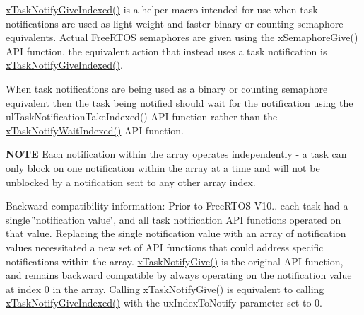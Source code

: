 \hyperlink{externals_2freertos_2include_2task_8h_a53ec0c8b6b8281a3055747813570193c}{x\+Task\+Notify\+Give\+Indexed()} is a helper macro intended for use when task notifications are used as light weight and faster binary or counting semaphore equivalents. Actual Free\+R\+T\+OS semaphores are given using the \hyperlink{externals_2freertos_2include_2semphr_8h_aae55761cabfa9bf85c8f4430f78c0953}{x\+Semaphore\+Give()} A\+PI function, the equivalent action that instead uses a task notification is \hyperlink{externals_2freertos_2include_2task_8h_a53ec0c8b6b8281a3055747813570193c}{x\+Task\+Notify\+Give\+Indexed()}.

When task notifications are being used as a binary or counting semaphore equivalent then the task being notified should wait for the notification using the ul\+Task\+Notification\+Take\+Indexed() A\+PI function rather than the \hyperlink{externals_2freertos_2include_2task_8h_a5bcd5a5b7d7c41dd782a38093be1b7c9}{x\+Task\+Notify\+Wait\+Indexed()} A\+PI function.

{\bfseries N\+O\+TE} Each notification within the array operates independently -\/ a task can only block on one notification within the array at a time and will not be unblocked by a notification sent to any other array index.

Backward compatibility information\+: Prior to Free\+R\+T\+OS V10.. each task had a single \char`\"{}notification value\char`\"{}, and all task notification A\+PI functions operated on that value. Replacing the single notification value with an array of notification values necessitated a new set of A\+PI functions that could address specific notifications within the array. \hyperlink{externals_2freertos_2include_2task_8h_ac60cbd05577a3e4f3c3587dd9b213930}{x\+Task\+Notify\+Give()} is the original A\+PI function, and remains backward compatible by always operating on the notification value at index 0 in the array. Calling \hyperlink{externals_2freertos_2include_2task_8h_ac60cbd05577a3e4f3c3587dd9b213930}{x\+Task\+Notify\+Give()} is equivalent to calling \hyperlink{externals_2freertos_2include_2task_8h_a53ec0c8b6b8281a3055747813570193c}{x\+Task\+Notify\+Give\+Indexed()} with the ux\+Index\+To\+Notify parameter set to 0.


